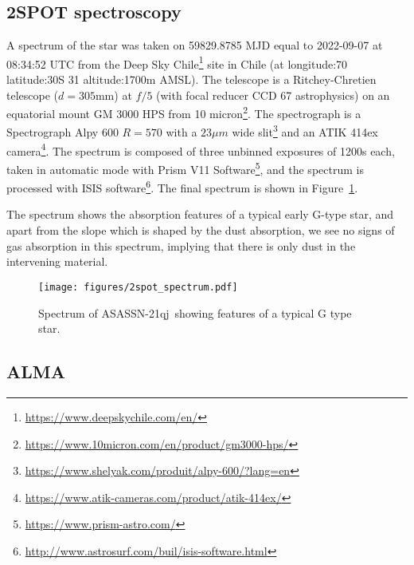 \documentclass{aa}
\newcommand{\asas}{ASASSN-21qj}
\begin{document}
\subsection{2SPOT spectroscopy}

A spectrum of the star was taken on 59829.8785 MJD equal to 2022-09-07 at 08:34:52 UTC from the Deep Sky Chile\footnote{\url{https://www.deepskychile.com/en/}} site in Chile (at longitude:70
latitude:30\degr S 31 altitude:1700m AMSL).
%
The telescope is a Ritchey-Chretien telescope ($d=305$mm) at $f/5$ (with focal reducer CCD 67 astrophysics) on an equatorial mount GM 3000 HPS from 10 micron\footnote{\url{https://www.10micron.com/en/product/gm3000-hps/}}.
%
The spectrograph is a Spectrograph Alpy 600 $R=570$ with a $23\mu m$ wide slit\footnote{\url{https://www.shelyak.com/produit/alpy-600/?lang=en}} and an ATIK 414ex camera\footnote{\url{https://www.atik-cameras.com/product/atik-414ex/}}.
%
The spectrum is composed of three unbinned exposures of 1200s each, taken in automatic mode with Prism V11 Software\footnote{\url{https://www.prism-astro.com/}}, and the spectrum is processed with ISIS software\footnote{\url{http://www.astrosurf.com/buil/isis-software.html}}.
%
The final spectrum is shown in Figure~\ref{fig:2spotspectrum}.

The spectrum shows the absorption features of a typical early G-type star, and apart from the slope which is shaped by the dust absorption, we see no signs of gas absorption in this spectrum, implying that there is only dust in the intervening material.



\begin{figure}
    \begin{centering}
        \texttt{[image: figures/2spot\_spectrum.pdf]}
\caption{Spectrum of \asas\ showing features of a typical G type star.}
        \label{fig:2spotspectrum}
    \end{centering}
\end{figure}

\subsection{ALMA}
\end{document}
